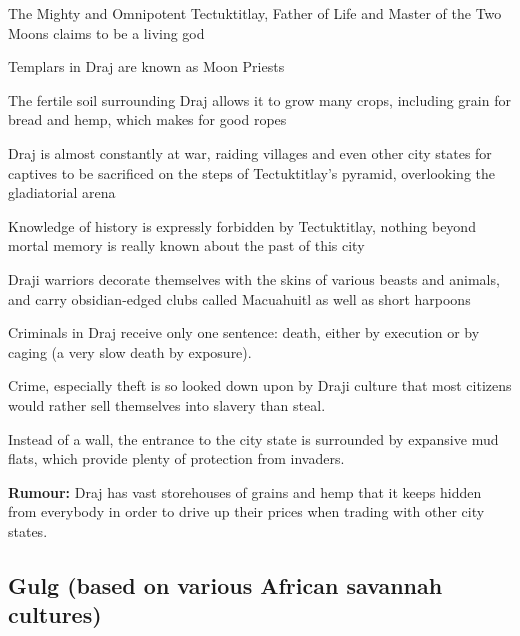 \begin{description}
    \item The Mighty and Omnipotent Tectuktitlay, Father of Life and Master of the Two Moons claims to be a living god
    \item Templars in Draj are known as Moon Priests
    \item The fertile soil surrounding Draj allows it to grow many crops, including grain for bread and hemp, which makes for good ropes
    \item Draj is almost constantly at war, raiding villages and even other city states for captives to be sacrificed on the steps of Tectuktitlay’s pyramid, overlooking the gladiatorial arena
    \item Knowledge of history is expressly forbidden by Tectuktitlay, nothing beyond mortal memory is really known about the past of this city
    \item Draji warriors decorate themselves with the skins of various beasts and animals, and carry obsidian-edged clubs called Macuahuitl as well as short harpoons
    \item Criminals in Draj receive only one sentence: death, either by execution or by caging (a very slow death by exposure).
    \item Crime, especially theft is so looked down upon by Draji culture that most citizens would rather sell themselves into slavery than steal.
    \item Instead of a wall, the entrance to the city state is surrounded by expansive mud flats, which provide plenty of protection from invaders.
    \item \textbf{Rumour:} Draj has vast storehouses of grains and hemp that it keeps hidden from everybody in order to drive up their prices when trading with other city states.
\end{description}

\subsection{Gulg (based on various African savannah cultures)}

